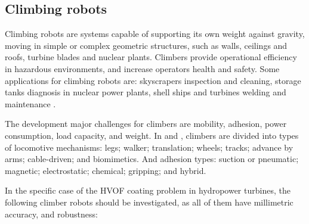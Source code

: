 \subsection{Climbing robots}\label{sota_climbers}
Climbing robots are systems capable of supporting its own weight against
gravity, moving in simple or complex geometric structures, such as
walls, ceilings and roofs, turbine blades and nuclear plants.
Climbers provide operational efficiency in hazardous environments, and increase
operators health and safety. Some applications for climbing robots are:
skyscrapers inspection and cleaning, storage tanks diagnosis in nuclear
power plants, shell ships and turbines welding and
maintenance \citep{armada2003application}.

The development major challenges for climbers are mobility, adhesion, power
consumption, load capacity, and weight. In \cite{modular} and \cite{climbsurv},
climbers are divided into types of locomotive mechanisms: legs; walker; translation; wheels; tracks;
advance by arms; cable-driven; and biomimetics. And adhesion types:
suction or pneumatic; magnetic; electrostatic; chemical; gripping; and hybrid.

In the specific case of the HVOF coating problem in hydropower turbines, the
following climber robots should be investigated, as all of them have millimetric
accuracy, and robustness:

